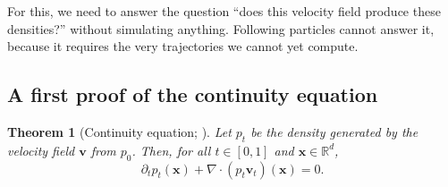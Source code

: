 \documentclass[11pt,a4paper]{article}
\numberwithin{equation}{section}     %
\theoremstyle{plain}        %
\newtheorem{theorem}{Theorem}[section]
\theoremstyle{definition}   %
\theoremstyle{remark}       %
\begin{document}
For this, we need to answer the question ``does this velocity field produce these densities?'' without simulating anything. Following particles cannot answer it, because it requires the very trajectories we cannot yet compute.

\subsection{A first proof of the continuity equation}

\begin{theorem}[Continuity equation; \citealp{ambrosio2008}]\label{thm:ce}
Let $p_t$ be the density generated by the velocity field $\mathbf{v}$ from $p_0$. Then, for all $t\in[0,1]$ and $\mathbf{x}\in\mathbb{R}^d$,
\begin{equation}\label{eq:ce}
\partial_t p_t(\mathbf{x}) + \nabla\cdot\left(p_t\mathbf{v}_t\right)(\mathbf{x}) = 0 .
\end{equation}
\end{theorem}
\end{document}
